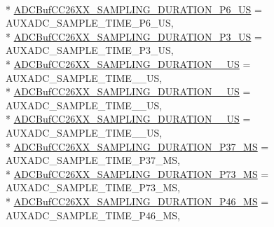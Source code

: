 \begin{DoxyCompactItemize}
\\*
\hyperlink{_a_d_c_buf_c_c26_x_x_8h_a4a95bf383dea0206b6708496a034a9fba150c59385da570a79aea1e4c0c1e914b}{A\+D\+C\+Buf\+C\+C26\+X\+X\+\_\+\+S\+A\+M\+P\+L\+I\+N\+G\+\_\+\+D\+U\+R\+A\+T\+I\+O\+N\+\_\+P6\+\_\+\+U\+S} = A\+U\+X\+A\+D\+C\+\_\+\+S\+A\+M\+P\+L\+E\+\_\+\+T\+I\+M\+E\+\_\+P6\+\_\+\+U\+S, 
\\*
\hyperlink{_a_d_c_buf_c_c26_x_x_8h_a4a95bf383dea0206b6708496a034a9fba921a55551370c46180f3ab729a4da912}{A\+D\+C\+Buf\+C\+C26\+X\+X\+\_\+\+S\+A\+M\+P\+L\+I\+N\+G\+\_\+\+D\+U\+R\+A\+T\+I\+O\+N\+\_\+P3\+\_\+\+U\+S} = A\+U\+X\+A\+D\+C\+\_\+\+S\+A\+M\+P\+L\+E\+\_\+\+T\+I\+M\+E\+\_\+P3\+\_\+\+U\+S, 
\\*
\hyperlink{_a_d_c_buf_c_c26_x_x_8h_a4a95bf383dea0206b6708496a034a9fbad1d82e9bb12e373860ad36ba6cee7a9f}{A\+D\+C\+Buf\+C\+C26\+X\+X\+\_\+\+S\+A\+M\+P\+L\+I\+N\+G\+\_\+\+D\+U\+R\+A\+T\+I\+O\+N\+\_\+\_\+\+U\+S} = A\+U\+X\+A\+D\+C\+\_\+\+S\+A\+M\+P\+L\+E\+\_\+\+T\+I\+M\+E\+\_\+\_\+\+U\+S, 
\\*
\hyperlink{_a_d_c_buf_c_c26_x_x_8h_a4a95bf383dea0206b6708496a034a9fba5d7638fadf06f706a13588e0c8957b27}{A\+D\+C\+Buf\+C\+C26\+X\+X\+\_\+\+S\+A\+M\+P\+L\+I\+N\+G\+\_\+\+D\+U\+R\+A\+T\+I\+O\+N\+\_\+\_\+\+U\+S} = A\+U\+X\+A\+D\+C\+\_\+\+S\+A\+M\+P\+L\+E\+\_\+\+T\+I\+M\+E\+\_\+\_\+\+U\+S, 
\\*
\hyperlink{_a_d_c_buf_c_c26_x_x_8h_a4a95bf383dea0206b6708496a034a9fba41124a9e4bc93d0ebbc01b78bc3e9a7e}{A\+D\+C\+Buf\+C\+C26\+X\+X\+\_\+\+S\+A\+M\+P\+L\+I\+N\+G\+\_\+\+D\+U\+R\+A\+T\+I\+O\+N\+\_\+\_\+\+U\+S} = A\+U\+X\+A\+D\+C\+\_\+\+S\+A\+M\+P\+L\+E\+\_\+\+T\+I\+M\+E\+\_\+\_\+\+U\+S, 
\\*
\hyperlink{_a_d_c_buf_c_c26_x_x_8h_a4a95bf383dea0206b6708496a034a9fbacb02ad19af7a0912549716115af13f88}{A\+D\+C\+Buf\+C\+C26\+X\+X\+\_\+\+S\+A\+M\+P\+L\+I\+N\+G\+\_\+\+D\+U\+R\+A\+T\+I\+O\+N\+\_\+P37\+\_\+\+M\+S} = A\+U\+X\+A\+D\+C\+\_\+\+S\+A\+M\+P\+L\+E\+\_\+\+T\+I\+M\+E\+\_\+P37\+\_\+\+M\+S, 
\\*
\hyperlink{_a_d_c_buf_c_c26_x_x_8h_a4a95bf383dea0206b6708496a034a9fbab73858ae3ffa520756cdfca77df35602}{A\+D\+C\+Buf\+C\+C26\+X\+X\+\_\+\+S\+A\+M\+P\+L\+I\+N\+G\+\_\+\+D\+U\+R\+A\+T\+I\+O\+N\+\_\+P73\+\_\+\+M\+S} = A\+U\+X\+A\+D\+C\+\_\+\+S\+A\+M\+P\+L\+E\+\_\+\+T\+I\+M\+E\+\_\+P73\+\_\+\+M\+S, 
\\*
\hyperlink{_a_d_c_buf_c_c26_x_x_8h_a4a95bf383dea0206b6708496a034a9fba4dea9b186e256b8cfb71722ae689889d}{A\+D\+C\+Buf\+C\+C26\+X\+X\+\_\+\+S\+A\+M\+P\+L\+I\+N\+G\+\_\+\+D\+U\+R\+A\+T\+I\+O\+N\+\_\+P46\+\_\+\+M\+S} = A\+U\+X\+A\+D\+C\+\_\+\+S\+A\+M\+P\+L\+E\+\_\+\+T\+I\+M\+E\+\_\+P46\+\_\+\+M\+S, 

\end{DoxyCompactItemize}
